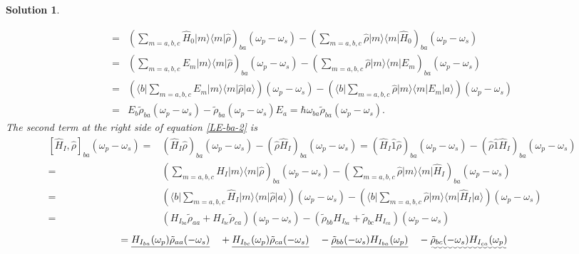 \documentclass[UTF8,10pt,a4paper]{article}
\theoremstyle{Problem}
\theoremstyle{Solution}
\newtheorem*{sol}{Solution}
\begin{document}
\begin{sol}
\begin{enumerate}
\begin{align}
            \nonumber=&\left(\sum_{m=a,b,c}\hat{H}_0\lvert m\rangle\langle m\rvert\hat{\rho}\right)_{ba}(\omega_p-\omega_s)-\left(\sum_{m=a,b,c}\hat{\rho}\lvert m\rangle\langle m\rvert\hat{H}_0\right)_{ba}(\omega_p-\omega_s)\\
            \nonumber=&\left(\sum_{m=a,b,c}E_m\lvert m\rangle\langle m\rvert\hat{\rho}\right)_{ba}(\omega_p-\omega_s)-\left(\sum_{m=a,b,c}\hat{\rho}\lvert m\rangle\langle m\rvert E_m\right)_{ba}(\omega_p-\omega_s)\\
            \nonumber=&\left(\langle b\rvert\sum_{m=a,b,c}E_m\lvert m\rangle\langle m\rvert\hat{\rho}\lvert a\rangle\right)(\omega_p-\omega_s)-\left(\langle b\rvert\sum_{m=a,b,c}\hat{\rho}\lvert m\rangle\langle m\rvert E_m\rvert a\rangle\right)(\omega_p-\omega_s)\\
            =&E_b\tilde{\rho}_{ba}(\omega_p-\omega_s)-\tilde{\rho}_{ba}(\omega_p-\omega_s)E_a=\hbar\omega_{ba}\tilde{\rho}_{ba}(\omega_p-\omega_s).
        \end{align}
        The second term at the right side of equation \eqref{LE-ba-2} is
        \begin{align}
            \nonumber[\hat{H}_I,\hat{\rho}]_{ba}(\omega_p-\omega_s)=&(\hat{H}_I\hat{\rho})_{ba}(\omega_p-\omega_s)-(\hat{\rho}\hat{H}_I)_{ba}(\omega_p-\omega_s)=(\hat{H}_I\hat{1}\hat{\rho})_{ba}(\omega_p-\omega_s)-(\hat{\rho}\hat{1}\hat{H}_I)_{ba}(\omega_p-\omega_s)\\
            \nonumber=&\left(\sum_{m=a,b,c}\hat{H}_I\lvert m\rangle\langle m\rvert\hat{\rho}\right)_{ba}(\omega_p-\omega_s)-\left(\sum_{m=a,b,c}\hat{\rho}\lvert m\rangle\langle m\rvert\hat{H}_I\right)_{ba}(\omega_p-\omega_s)\\
            \nonumber=&\left(\langle b\rvert\sum_{m=a,b,c}\hat{H}_I\lvert m\rangle\langle m\rvert\hat{\rho}\lvert a\rangle\right)(\omega_p-\omega_s)-\left(\langle b\rvert\sum_{m=a,b,c}\hat{\rho}\lvert m\rangle\langle m\rvert\hat{H}_I\lvert a\rangle\right)(\omega_p-\omega_s)\\
            \nonumber=&(H_{I_{ba}}\tilde{\rho}_{aa}+H_{I_{bc}}\tilde{\rho}_{ca})(\omega_p-\omega_s)-(\tilde{\rho}_{bb}H_{I_{ba}}+\tilde{\rho}_{bc}H_{I_{ca}})(\omega_p-\omega_s)
        \end{align}
        \begin{align}
            \nonumber&=\uline{H_{I_{ba}}(\omega_p)\tilde{\rho}_{aa}(-\omega_s)}&&+\uline{H_{I_{bc}}(\omega_p)\tilde{\rho}_{ca}(-\omega_s)}&&-\uline{\tilde{\rho}_{bb}(-\omega_s)H_{I_{ba}}(\omega_p)}&&-\uwave{\tilde{\rho}_{bc}(-\omega_s)H_{I_{ca}}(\omega_p)}\\

\end{align}
\end{enumerate}
\end{sol}
\end{document}
